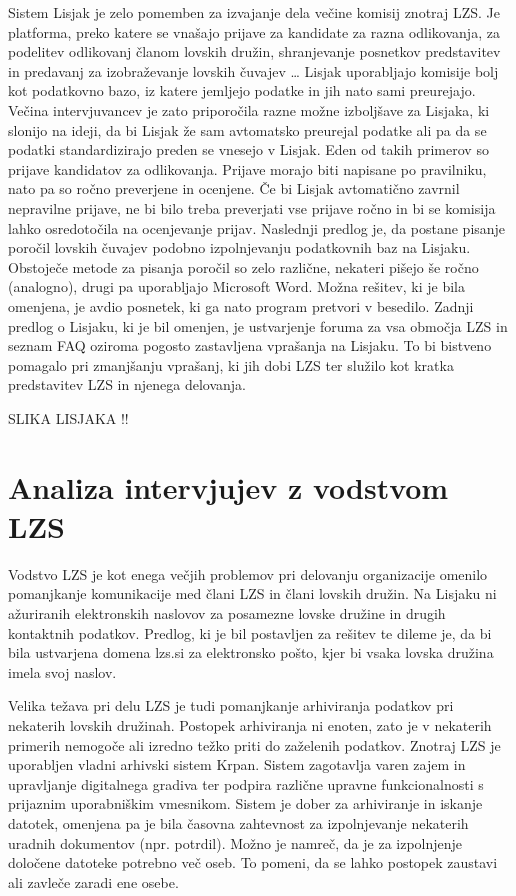 \documentclass[a4paper,12pt,openright]{book}
\begin{document}
Sistem Lisjak je zelo pomemben za izvajanje dela večine komisij znotraj LZS. 
Je platforma, preko katere se vnašajo prijave za kandidate za razna odlikovanja, za podelitev odlikovanj članom lovskih družin, shranjevanje posnetkov predstavitev in predavanj za izobraževanje lovskih čuvajev …
Lisjak uporabljajo komisije bolj kot podatkovno bazo, iz katere jemljejo podatke in jih nato sami preurejajo. 
Večina intervjuvancev je zato priporočila razne možne izboljšave za Lisjaka, ki slonijo na ideji, da bi Lisjak že sam avtomatsko preurejal podatke ali pa da se podatki standardizirajo preden se vnesejo v Lisjak.  
Eden od takih primerov so prijave kandidatov za odlikovanja.
Prijave morajo biti napisane po pravilniku, nato pa so ročno preverjene in ocenjene. 
Če bi Lisjak avtomatično zavrnil nepravilne prijave, ne bi bilo treba preverjati vse prijave ročno in bi se komisija lahko osredotočila na ocenjevanje prijav. 
Naslednji predlog je, da postane pisanje poročil lovskih čuvajev podobno izpolnjevanju podatkovnih baz na Lisjaku.
Obstoječe metode za pisanja poročil so zelo različne, nekateri pišejo še ročno (analogno), drugi pa uporabljajo Microsoft Word.
Možna rešitev, ki je bila omenjena, je avdio posnetek, ki ga nato program pretvori v besedilo. 
Zadnji predlog o Lisjaku, ki je bil omenjen, je ustvarjenje foruma za vsa območja LZS in seznam FAQ oziroma pogosto zastavljena vprašanja na Lisjaku. 
To bi bistveno pomagalo pri zmanjšanju vprašanj, ki jih dobi LZS ter služilo kot kratka predstavitev LZS in njenega delovanja.

SLIKA LISJAKA !!

\section{Analiza intervjujev z vodstvom LZS}

Vodstvo LZS je kot enega večjih problemov pri delovanju organizacije omenilo pomanjkanje komunikacije med člani LZS in člani lovskih družin.
Na Lisjaku ni ažuriranih elektronskih naslovov za posamezne lovske družine in drugih kontaktnih podatkov. 
Predlog, ki je bil postavljen za rešitev te dileme je, da bi bila ustvarjena domena lzs.si za elektronsko pošto, kjer bi vsaka lovska družina imela svoj naslov. 

Velika težava pri delu LZS je tudi pomanjkanje arhiviranja podatkov pri nekaterih lovskih družinah. 
Postopek arhiviranja ni enoten, zato je v nekaterih primerih nemogoče ali izredno težko priti do zaželenih podatkov.
Znotraj LZS je uporabljen vladni arhivski sistem Krpan.
Sistem zagotavlja varen zajem in upravljanje digitalnega gradiva ter podpira različne upravne funkcionalnosti s prijaznim uporabniškim vmesnikom.\cite{krpan}
Sistem je dober za arhiviranje in iskanje datotek, omenjena pa je bila časovna zahtevnost za izpolnjevanje nekaterih uradnih dokumentov (npr. potrdil). 
Možno je namreč, da je za izpolnjenje določene datoteke potrebno več oseb. 
To pomeni, da se lahko postopek zaustavi ali zavleče zaradi ene osebe. 
\end{document}
